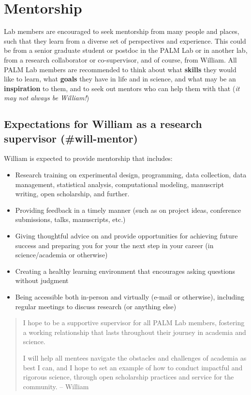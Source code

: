 \documentclass[
]{book}
\providecommand{\tightlist}{%
  \setlength{\itemsep}{0pt}\setlength{\parskip}{0pt}}
\theoremstyle{definition}
\theoremstyle{definition}
\theoremstyle{definition}
\theoremstyle{definition}
\theoremstyle{remark}
\begin{document}
\hypertarget{lab-mentorship}{%
\section{Mentorship}\label{lab-mentorship}}

Lab members are encouraged to seek mentorship from many people and places, such that they learn from a diverse set of perspectives and experience. This could be from a senior graduate student or postdoc in the PALM Lab or in another lab, from a research collaborator or co-supervisor, and of course, from William. All PALM Lab members are recommended to think about what \textbf{skills} they would like to learn, what \textbf{goals} they have in life and in science, and what may be an \textbf{inspiration} to them, and to seek out mentors who can help them with that (\emph{it may not always be William!})

\hypertarget{expectations-for-william-as-a-research-supervisor-will-mentor}{%
\subsection{Expectations for William as a research supervisor (\#will-mentor)}\label{expectations-for-william-as-a-research-supervisor-will-mentor}}

William is expected to provide mentorship that includes:

\begin{itemize}
\tightlist
\item
  Research training on experimental design, programming, data collection, data management, statistical analysis, computational modeling, manuscript writing, open scholarship, and further.
\item
  Providing feedback in a timely manner (such as on project ideas, conference submissions, talks, manuscripts, etc.)
\item
  Giving thoughtful advice on and provide opportunities for achieving future success and preparing you for your the next step in your career (in science/academia or otherwise)
\item
  Creating a healthy learning environment that encourages asking questions without judgment
\item
  Being accessible both in-person and virtually (e-mail or otherwise), including regular meetings to discuss research (or anything else)
\end{itemize}

\begin{quote}
I hope to be a supportive supervisor for all PALM Lab members, fostering a working relationship that lasts throughout their journey in academia and science.

I will help all mentees navigate the obstacles and challenges of academia as best I can, and I hope to set an example of how to conduct impactful and rigorous science, through open scholarship practices and service for the community. -- William
\end{quote}
\end{document}
